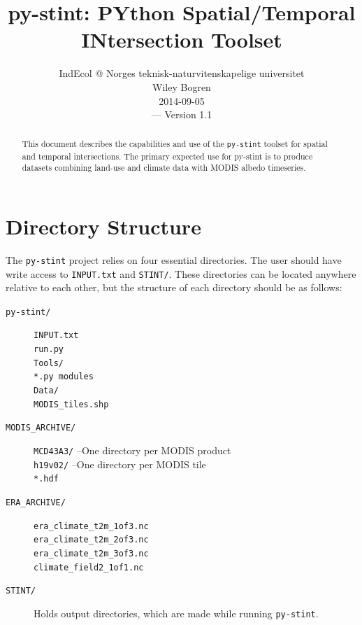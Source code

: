 \documentclass[twoside,a4paper]{refart}
\title{py-stint: PYthon Spatial/Temporal INtersection Toolset}
\author{IndEcol @ Norges teknisk-naturvitenskapelige universitet \\
Wiley Bogren \\
2014-09-05   \\
--- Version 1.1}
\date{}
\begin{document}
\maketitle

\begin{abstract}
        This document describes the capabilities and use of the 
        \texttt{py-stint} toolset for spatial and temporal 
        intersections.  The primary expected use for py-stint is 
        to produce datasets combining land-use and climate data 
        with MODIS albedo timeseries.
\end{abstract}


\tableofcontents

\newpage




\section{Directory Structure}
\label{dirs}
The \texttt{py-stint} project relies on four essential directories.  
The user should have write access to \texttt{INPUT.txt} and \texttt{STINT/}. 
These directories can be located anywhere relative to each other, but the structure of each directory should be as follows:

\begin{description}
\item[\texttt{py-stint/}]
        \texttt{INPUT.txt}\\
        \texttt{run.py}\\
        \texttt{Tools/}\\
          \-\hspace{0.5cm} \texttt{*.py modules}\\
          \-\hspace{0.5cm} \texttt{Data/}\\
            \-\hspace{1.0cm} \texttt{MODIS\_tiles.shp}

\item[\texttt{MODIS\_ARCHIVE/}]
        \texttt{MCD43A3/}  --One directory per MODIS product\\
          \-\hspace{0.5cm} \texttt{h19v02/}  --One directory per MODIS tile\\
            \-\hspace{1.0cm} \texttt{*.hdf}

\item[\texttt{ERA\_ARCHIVE/}]
        \texttt{era\_climate\_t2m\_1of3.nc}\\
        \texttt{era\_climate\_t2m\_2of3.nc}\\
        \texttt{era\_climate\_t2m\_3of3.nc}\\
        \texttt{climate\_field2\_1of1.nc}
\item[\texttt{STINT/}]
        Holds output directories, which are made while running \texttt{py-stint}.
\end{description}
\end{document}
